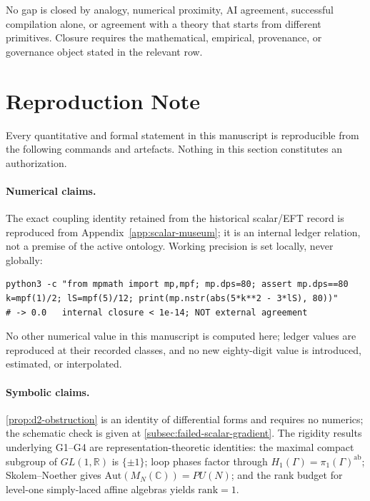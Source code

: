 \documentclass[12pt,a4paper,twoside]{article}
\theoremstyle{plain}
\theoremstyle{definition}
\theoremstyle{remark}
\begin{document}
\begin{governancebox}
No gap is closed by analogy, numerical proximity, AI agreement, successful
compilation alone, or agreement with a theory that starts from different
primitives. Closure requires the mathematical, empirical, provenance, or
governance object stated in the relevant row.
\end{governancebox}

\section{Reproduction Note}
\label{sec:reproduction-note}

\noindent Every quantitative and formal statement in this manuscript is
reproducible from the following commands and artefacts. Nothing in this
section constitutes an authorization.

\paragraph{Numerical claims.}
The exact coupling identity retained from the historical scalar/EFT record
is reproduced from Appendix~\ref{app:scalar-museum}; it is an internal
ledger relation, not a premise of the active ontology. Working precision
is set locally, never globally:
\begin{verbatim}
python3 -c "from mpmath import mp,mpf; mp.dps=80; assert mp.dps==80
k=mpf(1)/2; lS=mpf(5)/12; print(mp.nstr(abs(5*k**2 - 3*lS), 80))"
# -> 0.0   internal closure < 1e-14; NOT external agreement
\end{verbatim}
No other numerical value in this manuscript is computed here; ledger values
are reproduced at their recorded classes, and no new eighty-digit value
is introduced, estimated, or interpolated.

\paragraph{Symbolic claims.}
\cref{prop:d2-obstruction} is an identity of differential forms and
requires no numerics; the schematic check is given at
\cref{subsec:failed-scalar-gradient}. The rigidity results underlying
G1--G4 are representation-theoretic identities: the maximal compact
subgroup of $GL(1,\mathbb{R})$ is $\{\pm 1\}$; loop phases factor
through $H_1(\Gamma) = \pi_1(\Gamma)^{\mathrm{ab}}$; Skolem--Noether
gives $\mathrm{Aut}(M_N(\mathbb{C})) = PU(N)$; and the rank budget for
level-one simply-laced affine algebras yields $\mathrm{rank} = 1$.
\end{document}

